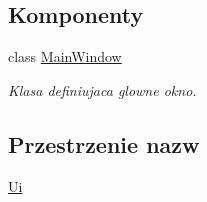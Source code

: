 \subsection*{Komponenty}
\begin{DoxyCompactItemize}
\item 
class \hyperlink{class_main_window}{Main\+Window}
\begin{DoxyCompactList}\small\item\em Klasa definiujaca glowne okno. \end{DoxyCompactList}\end{DoxyCompactItemize}
\subsection*{Przestrzenie nazw}
\begin{DoxyCompactItemize}
\item 
 \hyperlink{namespace_ui}{Ui}
\end{DoxyCompactItemize}
